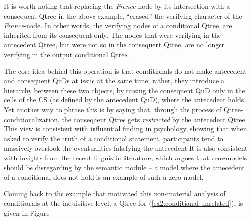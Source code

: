 It is worth noting that replacing the \textit{France}-node by its intersection with a consequent Qtree in the above example, ``erased'' the verifying character of the \textit{France}-node. In other words, the verifying nodes of a conditional Qtree, are inherited from its consequent only. The nodes that were verifying in the antecedent Qtree, but were not so in the consequent Qtree, are no longer verifying in the output conditional Qtree.

The core idea behind this operation is that conditionals do not make antecedent and consequent QuDs at issue at the same time; rather, they introduce a hierarchy between these two objects, by raising the consequent QuD only in the cells of the CS (as defined by the antecedent QuD), where the antecedent holds. Yet another way to phrase this is by saying that, through the process of Qtree-conditionalization, the consequent Qtree gets \textit{restricted} by the antecedent Qtree. This view is consistent with influential finding in psychology, showing that when asked to verify the truth of a conditional statement, participants tend to massively overlook the eventualities falsifying the antecedent \citep{Wason1968} It is also consistent with insights from the recent linguistic literature, which argues that zero-models should be disregarding by the semantic module \citep{Aloni2022} -- a model where the antecedent of a conditional does not hold is an example of such a zero-model.

Coming back to the example that motivated this non-material analysis of conditionals at the inquisitive level, a Qtree for (\ref{ex2:conditional-unrelated}), is given in Figure

